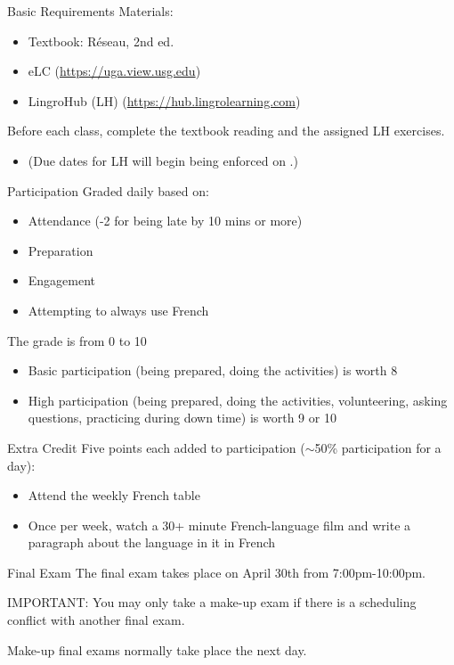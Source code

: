\begin{frame}{Basic Requirements}
  Materials:
  \begin{itemize}
    \item Textbook: Réseau, 2nd ed.
    \item eLC (\url{https://uga.view.usg.edu})
    \item LingroHub (LH) (\url{https://hub.lingrolearning.com})
  \end{itemize}
  \alert{Before each class}, complete the textbook reading and the assigned LH exercises.
  \begin{itemize}
    \item (Due dates for LH will begin being enforced on \mflDue{}.)
  \end{itemize}
\end{frame}

\begin{frame}{Participation}
  Graded daily based on:
  \begin{itemize}
    \item Attendance (-2 for being late by 10 mins or more)
    \item Preparation
    \item Engagement
    \item Attempting to always use French
  \end{itemize}
  The grade is from 0 to 10
  \begin{itemize}
    \item Basic participation (being prepared, doing the activities) is worth \alert{8}
    \item High participation (being prepared, doing the activities, volunteering, asking questions, practicing during down time) is worth \alert{9} or \alert{10}
  \end{itemize}
\end{frame}

\begin{frame}{Extra Credit}
  Five points each added to participation ($\sim$50\% participation for a day):
  \begin{itemize}
    \item Attend the weekly French table
    \item Once per week, watch a 30+ minute French-language film and write a paragraph about the language in it \alert{in French}
  \end{itemize}
\end{frame}

\begin{frame}{Final Exam}
  The final exam takes place on \alert{April 30th} from \alert{7:00pm-10:00pm}.
  \begin{center}
    \alert{IMPORTANT}: You may only take a make-up exam if there is a scheduling conflict with another final exam.
  \end{center}
  Make-up final exams normally take place the next day.
\end{frame}

